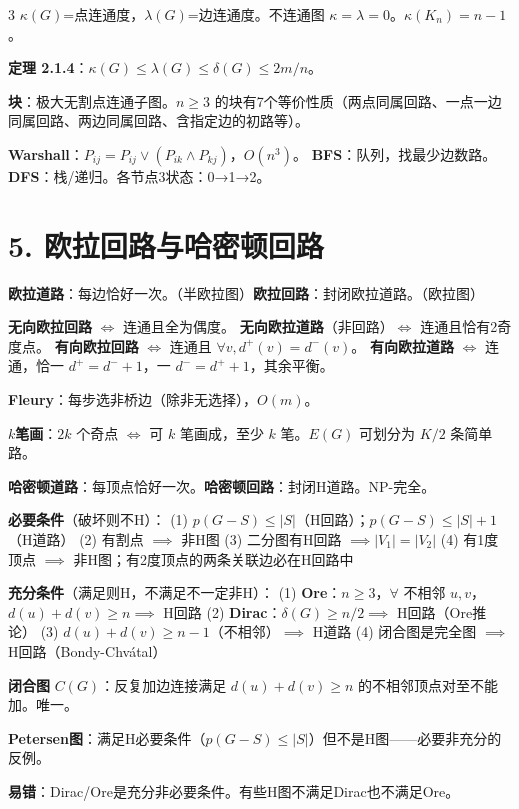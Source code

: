 \documentclass[10pt,a4paper,landscape]{ctexart}
\begin{document}
\begin{multicols}{3}
$\kappa(G)$=点连通度，$\lambda(G)$=边连通度。不连通图 $\kappa=\lambda=0$。$\kappa(K_n)=n-1$。

\textbf{定理 2.1.4}：$\kappa(G)\leq\lambda(G)\leq\delta(G)\leq 2m/n$。

\textbf{块}：极大无割点连通子图。$n\geq 3$ 的块有7个等价性质（两点同属回路、一点一边同属回路、两边同属回路、含指定边的初路等）。

\textbf{Warshall}：$P_{ij}=P_{ij}\lor(P_{ik}\land P_{kj})$，$O(n^3)$。
\textbf{BFS}：队列，找最少边数路。\textbf{DFS}：栈/递归。各节点3状态：0→1→2。

\section*{5. 欧拉回路与哈密顿回路}

\textbf{欧拉道路}：每边恰好一次。（半欧拉图）\textbf{欧拉回路}：封闭欧拉道路。（欧拉图）

\textbf{无向欧拉回路} $\iff$ 连通且全为偶度。
\textbf{无向欧拉道路}（非回路）$\iff$ 连通且恰有2奇度点。
\textbf{有向欧拉回路} $\iff$ 连通且 $\forall v,d^+(v)=d^-(v)$。
\textbf{有向欧拉道路} $\iff$ 连通，恰一 $d^+=d^-+1$，一 $d^-=d^++1$，其余平衡。

\textbf{Fleury}：每步选非桥边（除非无选择），$O(m)$。

\textbf{$k$笔画}：$2k$ 个奇点 $\iff$ 可 $k$ 笔画成，至少 $k$ 笔。$E(G)$ 可划分为 $K/2$ 条简单路。

\textbf{哈密顿道路}：每顶点恰好一次。\textbf{哈密顿回路}：封闭H道路。NP-完全。

\textbf{必要条件}（破坏则不H）：
(1) $p(G-S)\leq|S|$（H回路）；$p(G-S)\leq|S|+1$（H道路）
(2) 有割点 $\implies$ 非H图
(3) 二分图有H回路 $\implies |V_1|=|V_2|$
(4) 有1度顶点 $\implies$ 非H图；有2度顶点的两条关联边必在H回路中

\textbf{充分条件}（满足则H，不满足不一定非H）：
(1) \textbf{Ore}：$n\geq 3$，$\forall$ 不相邻 $u,v$，$d(u)+d(v)\geq n\implies$ H回路
(2) \textbf{Dirac}：$\delta(G)\geq n/2\implies$ H回路（Ore推论）
(3) $d(u)+d(v)\geq n-1$（不相邻）$\implies$ H道路
(4) 闭合图是完全图 $\implies$ H回路（Bondy-Chvátal）

\textbf{闭合图} $C(G)$：反复加边连接满足 $d(u)+d(v)\geq n$ 的不相邻顶点对至不能加。唯一。

\textbf{Petersen图}：满足H必要条件（$p(G-S)\leq|S|$）但不是H图——必要非充分的反例。

\textbf{易错}：Dirac/Ore是充分非必要条件。有些H图不满足Dirac也不满足Ore。


\end{multicols}
\end{document}
